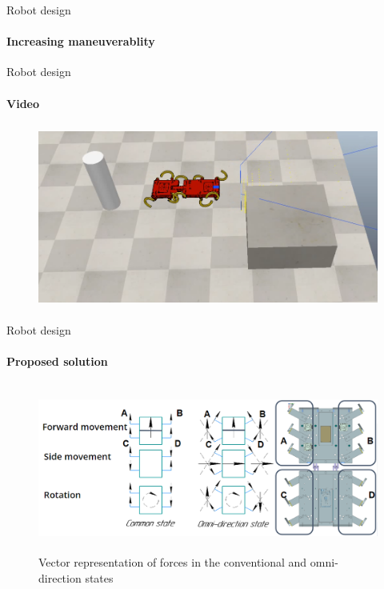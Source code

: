\documentclass[aspectratio=169]{beamer}
\begin{document}
\begin{frame}[t]{Robot design}
    \framesubtitle{Increasing maneuverablity}
\end{frame}

\begin{frame}[t]{Robot design}
    \framesubtitle{Video}
    \vspace{-0.6cm}
    \begin{figure}[H]
        \href{https://youtu.be/EQ6oGZVDpoc}{
            \centering\includegraphics[height=6cm,width=1\textwidth,keepaspectratio]{sidestep_segment_video_preview.png}}
    \end{figure}
\end{frame}

\begin{frame}[t]{Robot design}
    \framesubtitle{Proposed solution}
    \vspace{-0.8cm}
    \begin{figure}[H]
        \centering\includegraphics[height=5.5cm,width=1\textwidth,keepaspectratio]{omni_rot.png}
        \caption*{Vector representation of forces in  the conventional and omni-direction states}
    \end{figure}
\end{frame}
\end{document}
